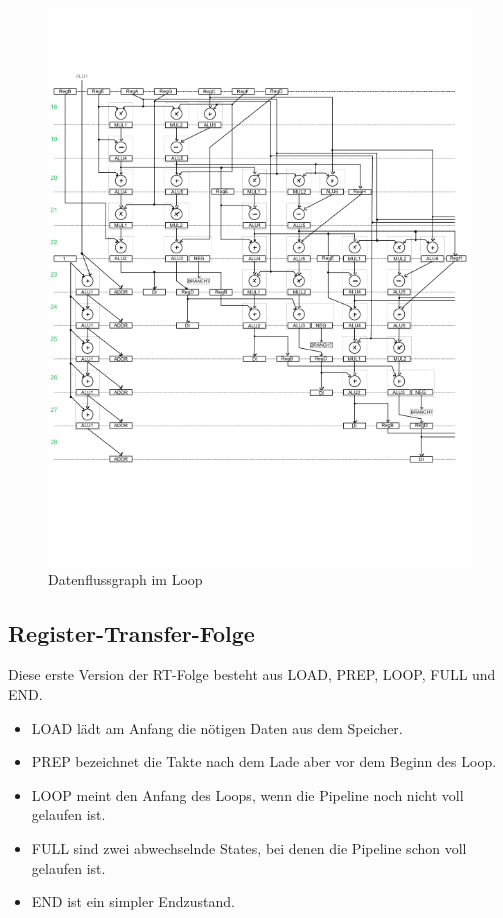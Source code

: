 \documentclass{article}
\begin{document}
    \begin{figure}
        \includegraphics[width=\textwidth]{../Diagramme/Datenflussdiagramm/DFG_VorerstFinal_S2.png}
        \caption{Datenflussgraph im Loop}
        \label{DFG2}
    \end{figure}

    \newpage
    
    \subsection{Register-Transfer-Folge}

    Diese erste Version der RT-Folge besteht aus LOAD, PREP, LOOP, FULL und END.
    \begin{itemize}
        \item LOAD lädt am Anfang die nötigen Daten aus dem Speicher.
        \item PREP bezeichnet die Takte nach dem Lade aber vor dem Beginn des Loop.
        \item LOOP meint den Anfang des Loops, wenn die Pipeline noch nicht voll gelaufen ist.
        \item FULL sind zwei abwechselnde States, bei denen die Pipeline schon voll gelaufen ist.
        \item END ist ein simpler Endzustand.
    \end{itemize}
\end{document}
